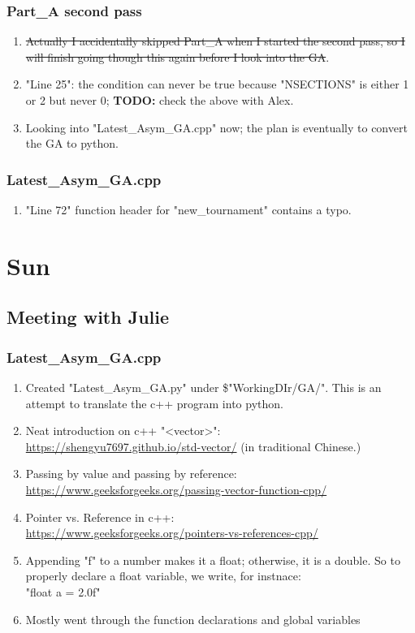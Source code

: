 \documentclass[12pt,letterpaper]{article}
\begin{document}
\subsubsection{Part\_A second pass}
\begin{enumerate}
  \item \st{Actually I accidentally skipped Part\_A when I started the second
      pass, so I will finish going though this again before I look into the GA}.
  \item "Line 25": the condition can never be true because "NSECTIONS" is 
    either 1 or 2 but never 0; \textbf{TODO:} check the above with Alex.
  \item Looking into "Latest_Asym_GA.cpp" now; the plan is eventually to
    convert the GA to python.
\end{enumerate}

\subsubsection{Latest\_Asym\_GA.cpp}
\begin{enumerate}
  \item "Line 72" function header for "new_tournament" contains a typo.
\end{enumerate}

\newpage
\setcounter{section}{24}

\section{Sun}
\subsection{Meeting with Julie}
\subsubsection{Latest\_Asym\_GA.cpp}
\begin{enumerate}
  \item Created "Latest_Asym_GA.py" under \$"WorkingDIr/GA/". This is an attempt to
    translate the c++ program into python. 
  \item Neat introduction on c++ "<vector>":\\
    \url{https://shengyu7697.github.io/std-vector/} (in traditional Chinese.)
  \item Passing by value and passing by reference:\\
    \url{https://www.geeksforgeeks.org/passing-vector-function-cpp/}
  \item Pointer vs. Reference in c++:\\
    \url{https://www.geeksforgeeks.org/pointers-vs-references-cpp/}
  \item Appending "f" to a number makes it a float; otherwise, it is a double.
    So to properly declare a float variable, we write, for instnace: \\
    "float a = 2.0f"
  \item Mostly went through the function declarations and global variables 
\end{enumerate}
\end{document}
